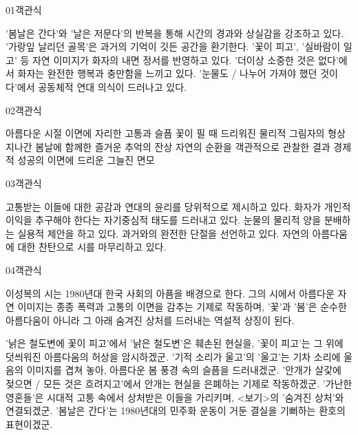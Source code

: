 \documentclass[fs85,seriesWit]{korfarm-base}
\begin{document}
\kfBeginMC
\begin{kfQBlock}{01}{객관식}
\begin{kfChoices}
\kfChoice '봄날은 간다'와 '날은 저문다'의 반복을 통해 시간의 경과와 상실감을 강조하고 있다.
\kfChoice '가랑잎 날리던 골목'은 과거의 기억이 깃든 공간을 환기한다.
\kfChoice '꽃이 피고', '실바람이 일고' 등 자연 이미지가 화자의 내면 정서를 반영하고 있다.
\kfChoice '더이상 소중한 것은 없다'에서 화자는 완전한 행복과 충만함을 느끼고 있다.
\kfChoice '눈물도 / 나누어 가져야 했던 것이다'에서 공동체적 연대 의식이 드러나고 있다.
\end{kfChoices}
\end{kfQBlock}

\begin{kfQBlock}{02}{객관식}
\begin{kfChoices}
\kfChoice 아름다운 시절 이면에 자리한 고통과 슬픔
\kfChoice 꽃이 필 때 드리워진 물리적 그림자의 형상
\kfChoice 지나간 봄날에 함께한 즐거운 추억의 잔상
\kfChoice 자연의 순환을 객관적으로 관찰한 결과
\kfChoice 경제적 성공의 이면에 드리운 그늘진 면모
\end{kfChoices}
\end{kfQBlock}

\begin{kfQBlock}{03}{객관식}
\begin{kfChoices}
\kfChoice 고통받는 이들에 대한 공감과 연대의 윤리를 당위적으로 제시하고 있다.
\kfChoice 화자가 개인적 이익을 추구해야 한다는 자기중심적 태도를 드러내고 있다.
\kfChoice 눈물의 물리적 양을 분배하는 실용적 제안을 하고 있다.
\kfChoice 과거와의 완전한 단절을 선언하고 있다.
\kfChoice 자연의 아름다움에 대한 찬탄으로 시를 마무리하고 있다.
\end{kfChoices}
\end{kfQBlock}

\begin{kfQBlock}{04}{객관식}
\begin{kfEvidence}이성복의 시는 1980년대 한국 사회의 아픔을 배경으로 한다. 그의 시에서 아름다운 자연 이미지는 종종 폭력과 고통의 이면을 감추는 기제로 작동하며, '꽃'과 '봄'은 순수한 아름다움이 아니라 그 아래 숨겨진 상처를 드러내는 역설적 상징이 된다.\end{kfEvidence}
\begin{kfChoices}
\kfChoice '낡은 철도변에 꽃이 피고'에서 '낡은 철도변'은 훼손된 현실을, '꽃이 피고'는 그 위에 덧씌워진 아름다움의 허상을 암시하겠군.
\kfChoice '기적 소리가 울고'의 '울고'는 기차 소리에 울음의 이미지를 겹쳐 놓아, 아름다운 봄 풍경 속의 슬픔을 드러내겠군.
\kfChoice '안개가 살갗에 젖으면 / 모든 것은 흐려지고'에서 안개는 현실을 은폐하는 기제로 작동하겠군.
\kfChoice '가난한 영혼들'은 시대적 고통 속에서 상처받은 이들을 가리키며, <보기>의 '숨겨진 상처'와 연결되겠군.
\kfChoice '봄날은 간다'는 1980년대의 민주화 운동이 거둔 결실을 기뻐하는 환호의 표현이겠군.
\end{kfChoices}
\end{kfQBlock}
\end{document}
